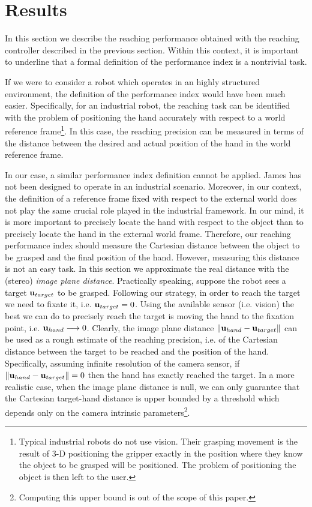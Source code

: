 \section{Results}
\label{sec:results}

In this section we describe the reaching performance obtained with 
the reaching controller described in the previous section. Within this context,
it is important to underline that a formal definition of the performance 
index is a nontrivial task. 

If we were to consider a robot which operates in an highly structured
environment, the definition of the performance index would have been much easier. 
Specifically, for an industrial robot, the reaching task can be identified 
with the problem of positioning the hand accurately with respect to a world 
reference frame\footnote{Typical industrial robots do not use vision. Their 
grasping movement is the result of 3-D positioning the gripper exactly in the 
position where they know the object to be grasped will be positioned. The problem
of positioning the object is then left to the user.}. In this case, the reaching 
precision can be measured in terms of the distance between the desired and 
actual position of the hand in the world reference frame.
 
In our case, a similar performance index definition cannot be applied. James has not 
been designed to operate in an industrial scenario. Moreover, in our context, the definition of a reference 
frame fixed with respect to the external world does not play the same crucial 
role played in the industrial framework. In our mind, it is more important to 
precisely locate the hand with respect to the object than to precisely locate 
the hand in the external world frame. Therefore, our reaching performance index 
should measure the Cartesian distance between the object to be grasped and the final 
position of the hand. However, measuring this distance is not an easy task. In this section
we approximate the real distance with the (stereo) \emph{image plane distance}. Practically speaking, suppose the 
robot sees a target $\mathbf{u}_{target}$ to be grasped. Following our strategy, in order to reach the 
target we need to fixate it, i.e. $\mathbf{u}_{target} = 0$. Using the available sensor (i.e. vision) the best we can do to precisely reach the target is moving the hand to the fixation point, i.e. $
{\mathbf{u}_{hand}} \longrightarrow 0$. Clearly, the image plane distance $\| \mathbf{u}_{hand} - \mathbf{u}_{target} \|$ can be used as a rough estimate of the reaching precision, i.e. of the Cartesian distance between the target to be reached and the position of the hand. Specifically, assuming infinite resolution of the camera sensor, if $\| \mathbf{u}_{hand} - \mathbf{u}_{target}\| = 0$ then the hand has exactly reached the target. In a more realistic case, when the image plane distance is null, we can only guarantee that the Cartesian target-hand distance is upper bounded by a threshold which depends only on the camera intrinsic parameters\footnote{
Computing this upper bound is out of the scope of this paper.}. 

